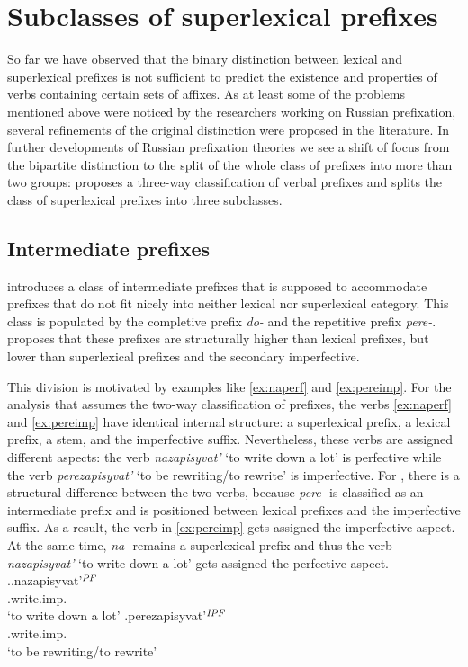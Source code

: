 \section{Subclasses of superlexical prefixes}\label{section:subclasses}
So far we have observed that the binary distinction between lexical and superlexical prefixes is not sufficient to predict the existence and properties of verbs containing certain sets of affixes. As at least some of the problems mentioned above were noticed by the researchers working on Russian prefixation, several refinements of the original distinction were proposed in the literature. In further developments of Russian prefixation theories we see a shift of focus from the bipartite distinction to the split of the whole class of prefixes into more than two groups: \citet{Tatevosov:07} proposes a three-way classification of verbal prefixes and \citet{Tatevosov:09} splits the class of superlexical prefixes into three subclasses.

\subsection{Intermediate prefixes}
\cite{Tatevosov:07} introduces a class of intermediate prefixes that is supposed to accommodate prefixes that do not fit nicely into neither lexical nor superlexical category. This class is populated by the completive prefix \textit{do-} and the repetitive prefix \textit{pere-}. \citet{Tatevosov:07} proposes that these prefixes are structurally higher than lexical prefixes, but lower than superlexical prefixes and the secondary imperfective. 

This division is motivated by examples like \ref{ex:naperf} and \ref{ex:pereimp}. For the analysis that assumes the two-way classification of prefixes, the verbs \ref{ex:naperf} and \ref{ex:pereimp} have identical internal structure: a superlexical prefix, a lexical prefix, a stem, and the imperfective suffix. Nevertheless, these verbs are assigned different aspects: the verb \textit{nazapisyvat'} `to write down a lot' is perfective while the verb \textit{perezapisyvat'} `to be rewriting/to rewrite' is imperfective. For \citet{Tatevosov:07}, there is a structural difference between the two verbs, because \textit{pere}- is classified as an intermediate prefix and is positioned between lexical prefixes and the imperfective suffix. As a result, the verb in \ref{ex:pereimp} gets assigned the imperfective aspect. At the same time, \textit{na}- remains a superlexical prefix and thus the verb \textit{nazapisyvat'} `to write down a lot' gets assigned the perfective aspect.
\ex.\ag.\label{ex:naperf}nazapisyvat'$^{{\mathit{PF}}}$\\
.write.imp.\\
`to write down a lot'
\bg.\label{ex:pereimp}perezapisyvat'$^{{\mathit{IPF}}}$\\
.write.imp.\\
`to be rewriting/to rewrite'

